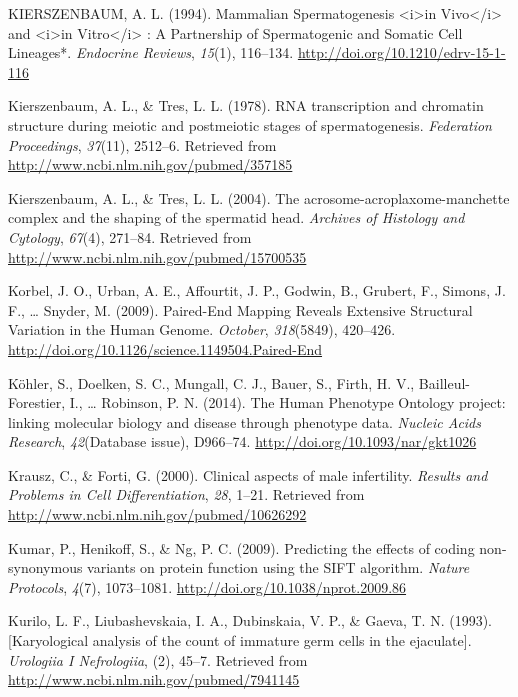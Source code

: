 \documentclass[12pt,twoside]{reedthesis}
\theoremstyle{definition}
\theoremstyle{definition}
\theoremstyle{remark}
\begin{document}
  \hypertarget{ref-KIERSZENBAUM1994}{}
  KIERSZENBAUM, A. L. (1994). Mammalian Spermatogenesis
  \textless{}i\textgreater{}in Vivo\textless{}/i\textgreater{} and
  \textless{}i\textgreater{}in Vitro\textless{}/i\textgreater{} : A
  Partnership of Spermatogenic and Somatic Cell Lineages*. \emph{Endocrine
  Reviews}, \emph{15}(1), 116--134.
  \url{http://doi.org/10.1210/edrv-15-1-116}
  
  \hypertarget{ref-Kierszenbaum1978}{}
  Kierszenbaum, A. L., \& Tres, L. L. (1978). RNA transcription and
  chromatin structure during meiotic and postmeiotic stages of
  spermatogenesis. \emph{Federation Proceedings}, \emph{37}(11), 2512--6.
  Retrieved from \url{http://www.ncbi.nlm.nih.gov/pubmed/357185}
  
  \hypertarget{ref-Kierszenbaum2004}{}
  Kierszenbaum, A. L., \& Tres, L. L. (2004). The
  acrosome-acroplaxome-manchette complex and the shaping of the spermatid
  head. \emph{Archives of Histology and Cytology}, \emph{67}(4), 271--84.
  Retrieved from \url{http://www.ncbi.nlm.nih.gov/pubmed/15700535}
  
  \hypertarget{ref-Korbel2009}{}
  Korbel, J. O., Urban, A. E., Affourtit, J. P., Godwin, B., Grubert, F.,
  Simons, J. F., \ldots{} Snyder, M. (2009). Paired-End Mapping Reveals
  Extensive Structural Variation in the Human Genome. \emph{October},
  \emph{318}(5849), 420--426.
  \url{http://doi.org/10.1126/science.1149504.Paired-End}
  
  \hypertarget{ref-Kohler2014}{}
  Köhler, S., Doelken, S. C., Mungall, C. J., Bauer, S., Firth, H. V.,
  Bailleul-Forestier, I., \ldots{} Robinson, P. N. (2014). The Human
  Phenotype Ontology project: linking molecular biology and disease
  through phenotype data. \emph{Nucleic Acids Research},
  \emph{42}(Database issue), D966--74.
  \url{http://doi.org/10.1093/nar/gkt1026}
  
  \hypertarget{ref-Krausz2000}{}
  Krausz, C., \& Forti, G. (2000). Clinical aspects of male infertility.
  \emph{Results and Problems in Cell Differentiation}, \emph{28}, 1--21.
  Retrieved from \url{http://www.ncbi.nlm.nih.gov/pubmed/10626292}
  
  \hypertarget{ref-Kumar2009}{}
  Kumar, P., Henikoff, S., \& Ng, P. C. (2009). Predicting the effects of
  coding non-synonymous variants on protein function using the SIFT
  algorithm. \emph{Nature Protocols}, \emph{4}(7), 1073--1081.
  \url{http://doi.org/10.1038/nprot.2009.86}
  
  \hypertarget{ref-Kurilo}{}
  Kurilo, L. F., Liubashevskaia, I. A., Dubinskaia, V. P., \& Gaeva, T. N.
  (1993). {[}Karyological analysis of the count of immature germ cells in
  the ejaculate{]}. \emph{Urologiia I Nefrologiia}, (2), 45--7. Retrieved
  from \url{http://www.ncbi.nlm.nih.gov/pubmed/7941145}
  
\end{document}
